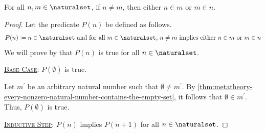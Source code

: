\begin{thm}
     \label{thm:metatheory-linear-ordering-of-natural-numbers}
    For all \( n, m \in \naturalset \), if \( n \neq m \), then either \( n \in m \) or \( m \in n \).
\end{thm}

\begin{proof}
    Let the predicate \( P(n) \) be defined as follows.
    \begin{equation*}
        P(n) \coloneq n \in \naturalset \text{ and for all \( m \in \naturalset \), \( n \neq m \) implies either \( n \in m \) or \( m \in n \)}
    \end{equation*}
    We will prove by  that \( P(n) \) is true for all \( n \in \naturalset \).

    \vspace{0.3cm}
    \noindent
    \underline{\scshape Base Case}: \( P(\emptyset) \) is true.

    \vspace{0.3cm}
    \noindent
    Let \( m^{\prime} \) be an arbitrary natural number such that \( \emptyset \neq m^{\prime} \).
    By \cref{thm:metatheory-every-nonzero-natural-number-contains-the-empty-set}, it follows that \( \emptyset \in m^{\prime} \).
    Thus, \( P(\emptyset) \) is true.

    \vspace{0.3cm}
    \noindent
    \underline{\scshape Inductive Step}: \( P(n) \) implies \( P(n + 1) \) for all \( n \in \naturalset \).


\end{proof}
